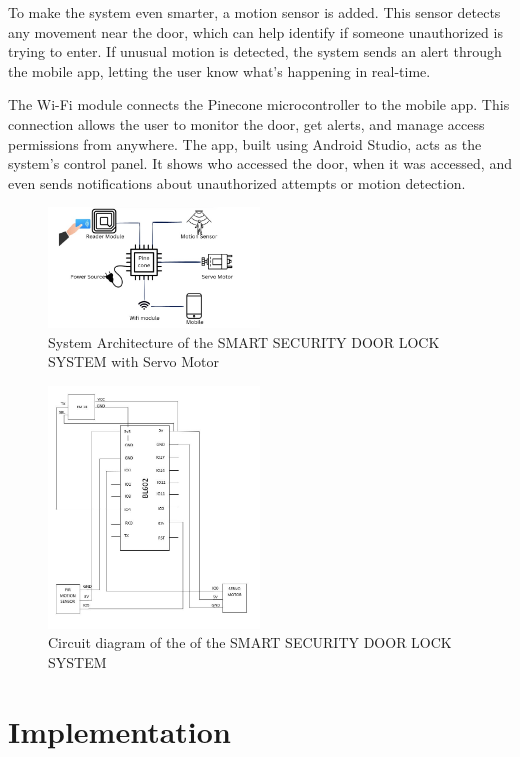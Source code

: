 \documentclass[USenglish,oneside,twocolumn]{article}
\begin{document}
To make the system even smarter, a motion sensor is added. This sensor detects any movement near the door, which can help identify if someone unauthorized is trying to enter. If unusual motion is detected, the system sends an alert through the mobile app, letting the user know what’s happening in real-time.

The Wi-Fi module connects the Pinecone microcontroller to the mobile app. This connection allows the user to monitor the door, get alerts, and manage access permissions from anywhere. The app, built using Android Studio, acts as the system’s control panel. It shows who accessed the door, when it was accessed, and even sends notifications about unauthorized attempts or motion detection.  
\begin{figure}[h!]
    \centering
    \includegraphics[width=0.5\textwidth]{architecture.jpeg}
    \caption{System Architecture of the SMART SECURITY DOOR LOCK SYSTEM with Servo Motor}
    \label{fig:system_architecture}
\end{figure}


\begin{figure}[h!]
    \centering
    \includegraphics[width=0.5\textwidth]{pin diagram.JPG}
    \caption{Circuit diagram of the of the SMART SECURITY DOOR LOCK SYSTEM }
    \label{fig:pin diagram}
\end{figure}

\section{Implementation}
\label{sec:Implementation}
\end{document}
